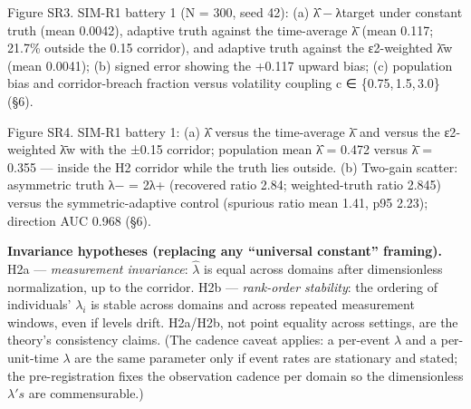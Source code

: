 \documentclass[
]{article}
\begin{document}
Figure SR3. SIM-R1 battery 1 ({N = 300}, seed 42): (a)
{\textbar{}λ̂ − λtarget\textbar{}} under constant truth (mean 0.0042),
adaptive truth against the time-average {λ̄} (mean 0.117; 21.7\% outside
the 0.15 corridor), and adaptive truth against the {ε2}-weighted {λ̄w}
(mean 0.0041); (b) signed error showing the {+0.117} upward bias; (c)
population bias and corridor-breach fraction versus volatility coupling
{c ∈ \{0.75, 1.5, 3.0\}} (§6).

Figure SR4. SIM-R1 battery 1: (a) {λ̂} versus the time-average {λ̄} and
versus the {ε2}-weighted {λ̄w} with the {±0.15} corridor; population mean
{λ̂ = 0.472} versus {λ̄ = 0.355} --- inside the H2 corridor while the
truth lies outside. (b) Two-gain scatter: asymmetric truth {λ− = 2λ+}
(recovered ratio 2.84; weighted-truth ratio 2.845) versus the
symmetric-adaptive control (spurious ratio mean 1.41, p95 2.23);
direction AUC 0.968 (§6).

\textbf{Invariance hypotheses (replacing any ``universal constant''
framing).} H2a --- \emph{measurement invariance}: \(\hat{\lambda}\) is
equal across domains after dimensionless normalization, up to the
corridor. H2b --- \emph{rank-order stability}: the ordering of
individuals' \(\lambda_i\) is stable across domains and across repeated
measurement windows, even if levels drift. H2a/H2b, not point equality
across settings, are the theory's consistency claims. (The cadence
caveat applies: a per-event \(\lambda\) and a per-unit-time \(\lambda\)
are the same parameter only if event rates are stationary and stated;
the pre-registration fixes the observation cadence per domain so the
dimensionless \(\lambda's\) are commensurable.)
\end{document}
